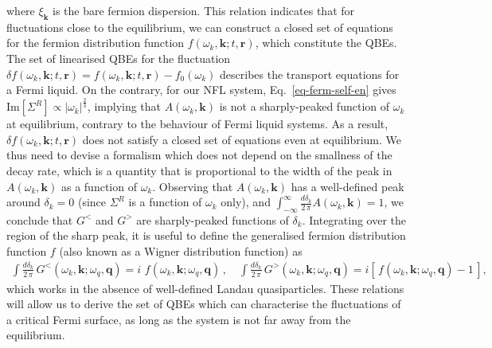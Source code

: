 \documentclass[aps, prb, onecolumn, nofootinbib, citeautoscript, 10pt]{revtex4-2}
\begin{document}
where $ \xi_\mathbf{k}$ is the bare fermion dispersion.
This relation indicates that for fluctuations close to the equilibrium, we can construct a closed set of  equations for the fermion distribution function $ f(\omega_k,\mathbf k;t,\mathbf r)$, which constitute the QBEs. The set of linearised QBEs for the fluctuation
$ \delta f(\omega_k,  \mathbf k;t,\mathbf r) = f(\omega_k, \mathbf k;t,\mathbf r) - f_0(\omega_k)$ describes the transport equations for a Fermi liquid. On the contrary, for our NFL system, Eq.~\eqref{eq-ferm-self-en} gives $ \text{Im} [\Sigma^R] \propto |\omega_k |^{ \frac{2} {3} }$, implying that $A(\omega_k, \mathbf{k})$ is not a sharply-peaked function of $\omega_k $ at equilibrium, contrary to the behaviour of Fermi liquid systems. As a result, $  \delta f(\omega_k, \mathbf k;t,\mathbf r)$ does not satisfy a closed set of equations even at equilibrium. We thus need to devise a formalism which does not depend on the smallness of the decay rate, which is a quantity that is proportional to the width of the peak in $A (\omega_k, \mathbf{k}) $ as a function of $\omega_k$. Observing that $A (\omega_k, \mathbf{k})$ has a well-defined peak around $ \delta_k = 0$ \cite{prange,kim_qbe} (since $\Sigma^R$ is a function of $\omega_k $ only), and $\int_{-\infty}^{\infty} \frac{d\delta_k}{ 2\, \pi  } A (\omega_k, \mathbf{k}) = 1$, we conclude that $G^<$ and $G^>$ are sharply-peaked functions of $\delta_k$. Integrating over the region of the sharp peak, it is useful to define the generalised fermion distribution function $f$ (also known as a Wigner distribution function) as~\cite{kim_qbe, prange}
\begin{align}
	\label{eq:gdf}
	\int \frac{d\delta_k}{ 2\, \pi  } \,
	G^<(\omega_k, {\mathbf k} ; \omega_q,\mathbf q) 
	=  i \, \,f(\omega_k, {\mathbf k} ;\omega_q, \mathbf q)\,,\quad
	\int \frac{d\delta_k }{ 2\, \pi  } \,
	G^>(\omega_k, {\mathbf k} ; \omega_q,\mathbf q) 
	= 
	i   \left[\, f(\omega_k,{\mathbf k};\omega_q, \mathbf q) -1 \, \right] ,
\end{align}
which works in the absence of well-defined Landau quasiparticles. These relations will allow us to derive the set of QBEs which can characterise the fluctuations of a critical Fermi surface, as long as the system is not far away from the equilibrium.
\end{document}
